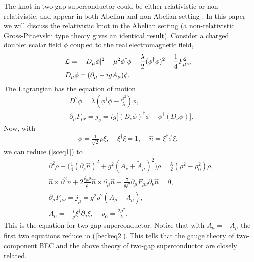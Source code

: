 \documentclass[twocolumn,showpacs,showkeys]{revtex4}
\newcommand{\bea}{\begin{eqnarray}}
\newcommand{\eea}{\end{eqnarray}}
\newcommand{\dfrac}{\displaystyle\frac}
\newcommand{\nn}{\nonumber}
\begin{document}
The knot in two-gap superconductor could be either relativistic
or non-relativistic, and appear in both Abelian and non-Abelian
setting \cite{cm2}. In this paper we will discuss the relativistic 
knot in the Abelian setting (a non-relativistic
Gross-Pitaevskii type theory gives an identical result).
Consider a charged doublet scalar field $\phi$ coupled to
the real electromagnetic field,
\bea
&{\cal L} = - |D_\mu \phi|^2 + \mu^2 \phi^{\dagger}\phi 
- \dfrac{\lambda}{2} (\phi^{\dagger} \phi)^2
- \dfrac{1}{4} F_{\mu \nu}^2 , \nn\\
&D_\mu \phi = (\partial_\mu - ig A_\mu) \phi.
\label{sclag}
\eea
The Lagrangian has the equation of motion
\bea
&D^2\phi =\lambda(\phi^{\dagger} \phi
-\dfrac{\mu^2}{\lambda})\phi, \nn\\
&\partial_\mu F_{\mu \nu} = j_\nu =  i g \Big[(D_\nu
\phi)^{\dagger}\phi - \phi ^{\dagger}(D_\nu \phi) \Big].
\label{sceq1}
\eea
Now, with
\bea
\phi =\dfrac{1}{\sqrt 2} \rho \xi,~~~~~{\xi}^{\dagger}\xi = 1,
~~~~~\hat n = \xi^{\dagger} \vec \sigma \xi,
\eea
we can reduce (\ref{sceq1}) to \cite{cm2}
\bea
&\partial ^2 \rho - \Big(
\dfrac{1}{4} (\partial _\mu \hat n)^2+ g^2
(A_\mu + \tilde A_\mu)^2 \Big) \rho
= \dfrac{\lambda}{2} (\rho^2-\rho_0^2)\rho, \nn\\
&\hat n \times \partial ^2 \hat n + 2 \dfrac{\partial_\mu \rho}{
\rho} \hat n \times \partial_\mu \hat n
+ \dfrac{2}{g\rho^2} \partial_\mu F_{\mu\nu} \partial_\nu \hat n =0, \nn\\
&\partial_\mu F_{\mu\nu} = j_\mu
=g^2 \rho^2 (A_\mu + \tilde A_\mu), \nn\\
&\tilde A_\mu=-\dfrac{i}{g} \xi^{\dagger}\partial_\mu \xi,
~~~~~\rho_0=\dfrac{2\mu^2}{\lambda}.
\label{sceq2}
\eea
This is the equation for two-gap superconductor.
Notice that with $A_\mu=-\tilde A_\mu$ the first two equations
reduce to (\ref{beckeq2}). This tells that the gauge theory of 
two-component BEC and the above theory of two-gap superconductor
are closely related.
\end{document}
